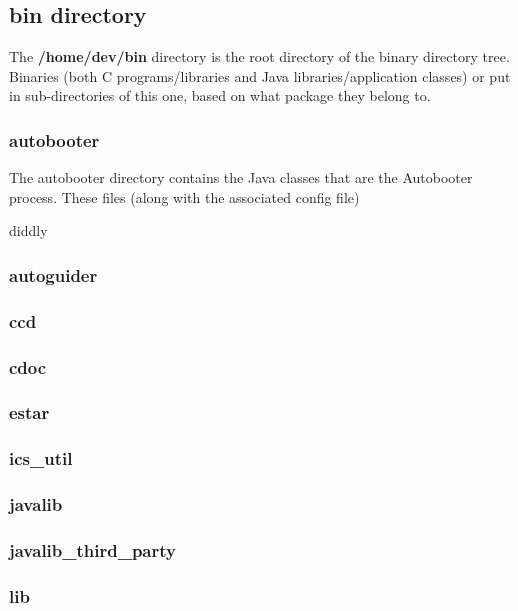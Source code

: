 \documentclass[10pt,a4paper]{article}
\begin{document}
\subsection{bin directory}

The {\bf /home/dev/bin} directory is the root directory of the binary directory tree. Binaries (both C programs/libraries and Java libraries/application classes) or put in sub-directories of this one, based on what package they belong to.

\subsubsection{autobooter}

The autobooter directory contains the Java classes that are the Autobooter process. These files (along with the associated config file)

diddly


\subsubsection{autoguider}

\subsubsection{ccd}

\subsubsection{cdoc}

\subsubsection{estar}

\subsubsection{ics\_util}

\subsubsection{javalib}

\subsubsection{javalib\_third\_party}

\subsubsection{lib}
\end{document}
